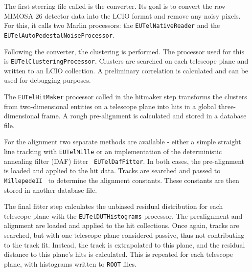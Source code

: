 The first steering file called is the converter. Its goal is to convert the raw
MIMOSA 26 detector data into the LCIO format and remove any noisy pixels. For
this, it calls two Marlin processors: the \texttt{EUTelNativeReader} and the
\texttt{EUTelAutoPede\-stalNoiseProcessor}.

Following the converter, the clustering is performed. The processor used for
this is \texttt{EUTelClusteringProcessor}. Clusters are searched on each
telescope plane and written to an LCIO collection. A preliminary correlation is
calculated and can be used for debugging purposes.

The \texttt{EUTelHitMaker} processor called in the hitmaker step transforms the
clusters from two-dimensional entities on a telescope plane into hits in a
global three-dimensional frame. A rough pre-alignment is calculated and stored
in a database file.

For the alignment two separate methods are available - either a simple straight
line tracking with \texttt{EUTelMille} or an implementation of the deterministic
annealing filter (DAF) fitter~\cite{ref:daffitter} \texttt{EUTelDafFitter}. In
both cases, the pre-alignment is loaded and applied to the hit data. Tracks are
searched and passed to \texttt{MillepedeII}~\cite{ref:millepede} to determine
the alignment constants. These constants are then stored in another database
file.

The final fitter step calculates the unbiased residual distribution for each
telescope plane with the \texttt{EUTelDUTHistograms} processor. The prealignment
and alignment are loaded and applied to the hit collections. Once again, tracks
are searched, but with one telescope plane considered passive, thus not
contributing to the track fit. Instead, the track is extrapolated to this plane,
and the residual distance to this plane's hits is calculated. This is repeated
for each telescope plane, with histograms written to \texttt{ROOT} files.


